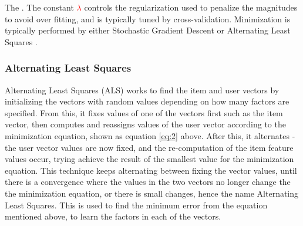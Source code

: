 The . The constant \textcolor{red}{\begin{math}\lambda\end{math}} controls the regularization used to penalize the magnitudes to avoid over fitting, and is typically tuned by cross-validation. Minimization is typically performed by either Stochastic Gradient Descent or Alternating Least Squares \cite{koren2011}. 



\subsubsection{Alternating Least Squares}

Alternating Least Squares (ALS) works to find the item and user vectors by initializing the vectors with random values depending on how many factors are specified. From this, it fixes values of one of the vectors first such as the item vector, then computes and reassigns values of the user vector according to the minimization equation, shown as equation \ref{eq:2} above. After this, it alternates - the user vector values are now fixed, and the re-computation of the item feature values occur, trying achieve the result of the smallest value for the minimization equation. This technique keeps alternating between fixing the vector values, until there is a convergence where the values in the two vectors no longer change the the minimization equation, or there is small changes, hence the name Alternating Least Squares. This is used to find the minimum error from the equation mentioned above, to learn the factors in each of the vectors. 

